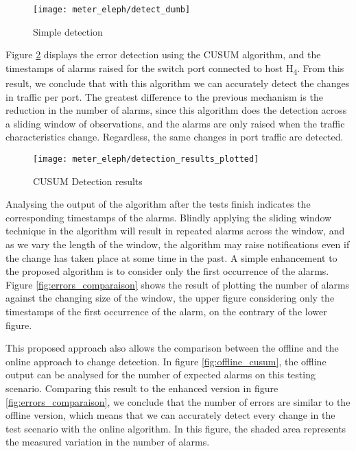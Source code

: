\begin{figure}[H]
    \centering
    \texttt{[image: meter\_eleph/detect\_dumb]}
    \caption {Simple detection}
    \label{fig:detect_dumb}
\end{figure} 

\par Figure \ref{fig:color_plot} displays the error detection using the CUSUM algorithm, and the timestamps of alarms raised for the switch port connected to
host H\textsubscript{4}. From this result, we conclude that with this algorithm we can accurately detect the changes in traffic per port. The greatest difference to
the previous mechanism is the reduction in the number of alarms, since this algorithm does the detection across a sliding window of observations, and the alarms are
only raised when the traffic characteristics change. Regardless, the same changes in port traffic are detected.

\begin{figure}[H]
    \centering
    \texttt{[image: meter\_eleph/detection\_results\_plotted]}
    \caption{CUSUM Detection results}
    \label{fig:color_plot}
\end{figure}

\par Analysing the output of the algorithm after the tests finish indicates the corresponding timestamps of the alarms. Blindly applying the sliding window technique
in the algorithm will result in repeated alarms across the window, and as we vary the length of the window, the algorithm may raise notifications even if the change
has taken place at some time in the past. A simple enhancement to the proposed algorithm is to consider only the first occurrence of the alarms. Figure
\ref{fig:errors_comparaison} shows the result of plotting the number of alarms against the changing size of the window, the upper figure considering only the
timestamps of the first occurrence of the alarm, on the contrary of the lower figure.

\par This proposed approach also allows the comparison between the offline and the online approach to change detection. In figure \ref{fig:offline_cusum}, the 
offline output can be analysed for the number of expected alarms on this testing scenario. Comparing this result to the enhanced version in figure 
\ref{fig:errors_comparaison}, we conclude that the number of errors are similar to the offline version, which means that we can accurately detect every change in
the test scenario with the online algorithm. In this figure, the shaded area represents the measured variation in the number of alarms.

